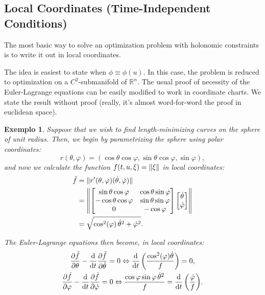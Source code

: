 \documentclass{article}
\theoremstyle{plain}
\theoremstyle{plain}
\newtheorem{example}{Exemplo}
\theoremstyle{nonumberplain}
\theoremstyle{empty}
\newcommand{\R}{\mathbb{R}}
\DeclarePairedDelimiter\norm{\lVert}{\rVert}
\begin{document}
\subsection{Local Coordinates (Time-Independent Conditions)}

The most basic way to solve an optimization problem with holonomic constraints is to write it out in local coordinates.

The idea is easiest to state when $\phi \equiv \phi(u)$. In this case, the problem is reduced to optimization on a $C^2$-submanifold of $\R^n$. The usual proof of necessity of the Euler-Lagrange equations can be easily modified to work in coordinate charts. We state the result without proof (really, it's almost word-for-word the proof in euclidean space).


\begin{example}\label{sphere1}
Suppose that we wish to find length-minimizing curves on the sphere of unit radius. Then, we begin by parametrizing the sphere using polar coordinates:
\[r(\theta, \varphi) = (\cos\theta \cos\varphi, \sin\theta \cos\varphi, \sin\varphi),\]
and now we calculate the function $f(t,u,\xi) = \norm\xi$ in local coordinates:
\begin{align*}
\tilde f &= \norm{r'(\theta, \varphi) (\dot \theta, \dot \varphi)}\\
&= \norm*{\begin{bmatrix}
\sin\theta \cos\varphi & \cos\theta \sin\varphi\\
-\cos\theta \cos\varphi & \sin\theta \sin\varphi\\
0 & -\cos\varphi
\end{bmatrix}
\begin{bmatrix}
\dot\theta\\
\dot\varphi
\end{bmatrix}
}\\
&= \sqrt{\cos^2(\varphi) \, \dot\theta^2 + \dot\varphi^2}.
\end{align*}

The Euler-Lagrange equations then become, in local coordinates:
\begin{gather*}
\diffp{\tilde f} \theta - \diff*{\diffp{\tilde f}{\dot \theta}}t = 0 \Leftrightarrow \diff*{\left( \frac{\cos^2(\varphi) \dot \theta}{f} \right)}t = 0,\\
\diffp{\tilde f} \varphi - \diff*{\diffp{\tilde f}{\dot \varphi}}t = 0
\Leftrightarrow
\frac{\cos\varphi \sin\varphi \,\dot \theta^2}{f} = \diff*{\left( \frac{\dot \varphi}{f} \right)}t.
\end{gather*}


\end{example}
\end{document}
